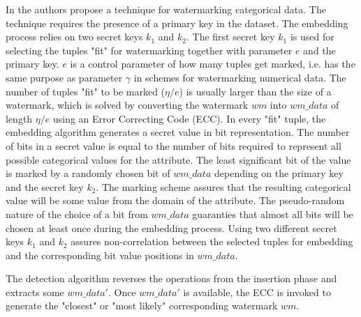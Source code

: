 In \cite{sion2004proving,sion2005rights} the authors propose a technique for watermarking categorical data.
The technique requires the presence of a primary key in the dataset.
The embedding process relies on two secret keys $k_1$ and $k_2$.
The first secret key $k_1$ is used for selecting the tuples "fit" for watermarking together with parameter $e$ and the primary key. 
$e$ is a control parameter of how many tuples get marked, i.e. has the same purpose as parameter $\gamma$ in schemes for watermarking numerical data. 
The number of tuples "fit" to be marked ($\eta/e$) is usually larger than the size of a watermark, which is solved by converting the watermark $wm$ into $wm\_data$ of length $\eta/e$ using an Error Correcting Code (ECC). 
In every "fit" tuple, the embedding algorithm generates a secret value in bit representation. 
The number of bits in a secret value is equal to the number of bits required to represent all possible categorical values for the attribute. 
The least significant bit of the value is marked by a randomly chosen bit of $wm\_data$ depending on the primary key and the secret key $k_2$. 
The marking scheme assures that the resulting categorical value will be some value from the domain of the attribute.
The pseudo-random nature of the choice of a bit from $wm\_data$ guaranties that almost all bits will be chosen at least once during the embedding process. 
Using two different secret keys $k_1$ and $k_2$ assures non-correlation between the selected tuples for embedding and the corresponding bit value positions in $wm\_data$. 

The detection algorithm reverses the operations from the insertion phase and extracts some $wm\_{data}'$. Once $wm\_{data}'$ is available, the ECC is invoked to generate the "closest" or "most likely" corresponding watermark $wm$. 

